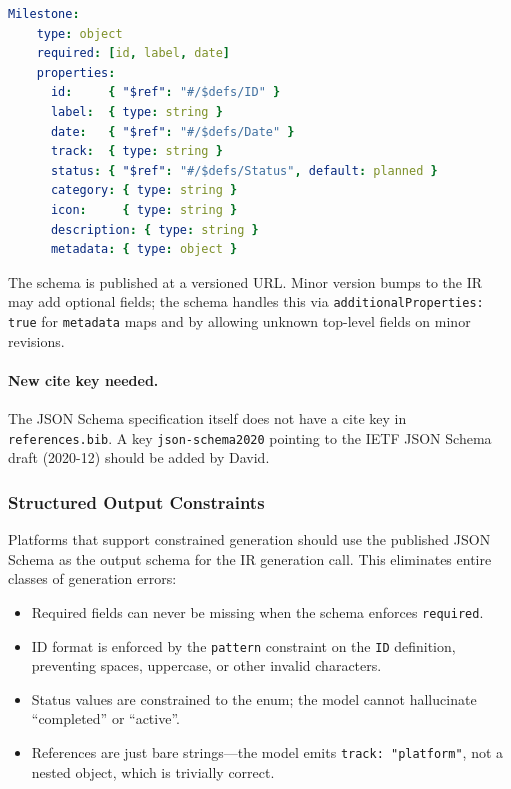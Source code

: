 \begin{lstlisting}[language=yaml,caption={Abbreviated JSON Schema for the IR (YAML representation)}]
  Milestone:
    type: object
    required: [id, label, date]
    properties:
      id:     { "$ref": "#/$defs/ID" }
      label:  { type: string }
      date:   { "$ref": "#/$defs/Date" }
      track:  { type: string }
      status: { "$ref": "#/$defs/Status", default: planned }
      category: { type: string }
      icon:     { type: string }
      description: { type: string }
      metadata: { type: object }
\end{lstlisting}

The schema is published at a versioned URL. Minor version bumps to the IR may add
optional fields; the schema handles this via \texttt{additionalProperties: true} for
\texttt{metadata} maps and by allowing unknown top-level fields on minor revisions.

\paragraph{New cite key needed.} The JSON Schema specification itself does not have a
cite key in \texttt{references.bib}. A key \texttt{json-schema2020} pointing to the
IETF JSON Schema draft (2020-12) should be added by David.


\subsubsection{Structured Output Constraints}
\label{sec:structured-outputs}

Platforms that support constrained generation \cite{openai-structured-outputs} should
use the published JSON Schema as the output schema for the IR generation call. This
eliminates entire classes of generation errors:

\begin{itemize}
  \item Required fields can never be missing when the schema enforces \texttt{required}.
  \item ID format is enforced by the \texttt{pattern} constraint on the \texttt{ID}
        definition, preventing spaces, uppercase, or other invalid characters.
  \item Status values are constrained to the enum; the model cannot hallucinate
        ``completed'' or ``active''.
  \item References are just bare strings---the model emits \texttt{track: "platform"},
        not a nested object, which is trivially correct.
\end{itemize}

